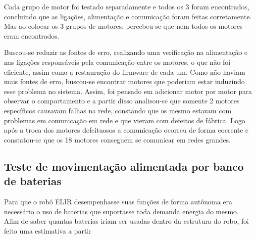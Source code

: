 Cada grupo de motor foi testado separadamente e todos os 3 foram encontrados, concluindo que as ligações, alimentação e comunicação foram feitas corretamente. Mas ao colocar os 3 grupos de motores, percebeu-se que nem todos os motores eram encontrados.

Buscou-se reduzir as fontes de erro, realizando uma verificação na alimentação e nas ligações responsáveis pela comunicação entre os motores, o que não foi eficiente, assim como a restauração do firmware de cada um. Como não haviam mais fontes de erro, buscou-se encontrar motores que poderiam estar induzindo esse problema no sistema. Assim, foi pensado em adicionar motor por motor para observar o comportamento e a partir disso analisou-se que somente 2 motores específicos causavam falhas na rede, constando que os mesmo estavam com problemas em comunicação em rede e que vieram com defeitos de fábrica. Logo após a troca dos motores defeituosos a comunicação ocorreu de forma coerente e constatou-se que os 18 motores conseguem se comunicar em redes grandes.

\subsection{Teste de movimentação alimentada por banco de baterias}\label{sec:test_bate}
Para que o robô ELIR desempenhasse suas funções de forma autônoma era necessário o uso de baterias que suportasse toda demanda energia do mesmo. Afim de saber quantas baterias iriam ser usadas dentro da estrutura do robo, foi feito uma estimativa a partir 

